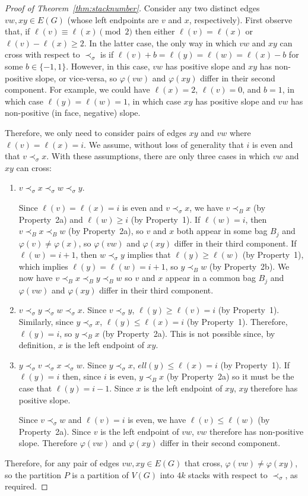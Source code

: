 \documentclass{jgaa-art}
\newcommand{\thmref}[1]{Theorem~\ref{thm:#1}}
\begin{document}
\begin{proof}[Proof of \thmref{stacknumber}]
  Consider any two distinct edges $vw,xy\in E(G)$ (whose left endpoints are $v$ and $x$, respectively).  First observe that, if $\ell(v)\equiv \ell(x)\pmod 2$ then either $\ell(v)=\ell(x)$ or $\ell(v)-\ell(x)\ge 2$. In the latter case, the only way in which $vw$ and $xy$ can cross with respect to $\prec_\sigma$ is if $\ell(v)+b = \ell(y)=\ell(w) = \ell(x)-b$ for some $b\in\{-1,1\}$.  However, in this case, $vw$ has positive slope and $xy$ has non-positive slope, or vice-versa, so $\varphi(vw)$ and $\varphi(xy)$ differ in their second component.  For example, we could have $\ell(x)=2$, $\ell(v)=0$, and $b=1$, in which case $\ell(y)=\ell(w)=1$, in which case $xy$ has positive slope and $vw$ has non-positive (in face, negative) slope.

  Therefore, we only need to consider pairs of edges $xy$ and $vw$ where $\ell(v)=\ell(x)=i$. We assume, without loss of generality that $i$ is even
  and that $v\prec_\sigma x$.  With these assumptions, there are only three cases in which $vw$ and $xy$ can cross:
  \begin{enumerate}
    \item $v\prec_\sigma x\prec_\sigma w\prec_\sigma y$.

    Since $\ell(v)=\ell(x)=i$ is even and $v\prec_\sigma x$, we have $v\prec_B x$  (by Property~2a) and $\ell(w)\ge i$ (by Property~1).  If $\ell(w)=i$, then $v\prec_B x\prec_B w$ (by Property~2a), so $v$ and $x$ both appear in some bag $B_j$ and $\varphi(v)\neq\varphi(x)$, so $\varphi(vw)$ and $\varphi(xy)$ differ in their third component.  If $\ell(w)=i+1$, then $w\prec_\sigma y$ implies that $\ell(y)\ge\ell(w)$ (by Property~1), which implies $\ell(y)=\ell(w)=i+1$, so $y\prec_B w$ (by Property~2b).  We now have $v\prec_B x\prec_B y\prec_B w$ so $v$ and $x$ appear in a common bag $B_j$ and $\varphi(vw)$ and $\varphi(xy)$ differ in their third component.

    \item $v\prec_\sigma y\prec_\sigma w\prec_\sigma x$.  Since $v\prec_\sigma y$, $\ell(y)\ge \ell(v)=i$ (by Property~1).  Similarly, since $y\prec_\sigma x$, $\ell(y)\le\ell(x)=i$ (by Property~1).  Therefore, $\ell(y)=i$, so $y\prec_B x$ (by Property~2a).  This is not possible since, by definition, $x$ is the left endpoint of $xy$.

    \item $y\prec_\sigma v\prec_\sigma x\prec_\sigma w$.  Since $y\prec_\sigma x$, $ell(y)\le \ell(x)=i$ (by Property~1).  If $\ell(y)=i$ then, since $i$ is even, $y\prec_B x$ (by Property~2a) so it must be the case that $\ell(y)=i-1$. Since $x$ is the left endpoint of $xy$, $xy$ therefore has positive slope.

    Since $v\prec_\sigma w$ and $\ell(v)=i$ is even, we have $\ell(v)\le\ell(w)$ (by Property~2a). Since $v$ is the left endpoint of $vw$, $vw$ therefore has non-positive slope.  Therefore $\varphi(vw)$ and $\varphi(xy)$ differ in their second component.
  \end{enumerate}
  Therefore, for any pair of edges $vw,xy\in E(G)$ that cross, $\varphi(vw)\neq\varphi(xy)$, so the partition $P$ is a partition of $V(G)$ into $4k$ stacks with respect to $\prec_\sigma$, as required.
\end{proof}
\end{document}
